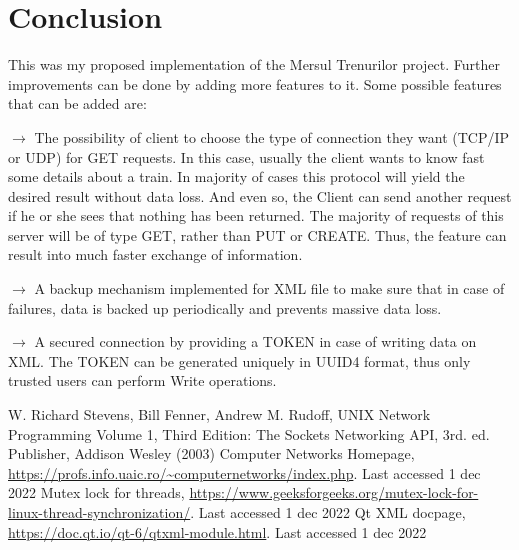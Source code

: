\documentclass[runningheads]{llncs}
\begin{document}
\section{Conclusion}

This was my proposed implementation of the Mersul Trenurilor project. Further improvements can be done by adding more features to it. Some possible features that can be added are:

$\rightarrow$ The possibility of client to choose the type of connection they want (TCP/IP or UDP) for GET requests. In this case, usually the client wants to know fast some details about a train. In majority of cases this protocol will yield the desired result without data loss. And even so, the Client can send another request if he or she sees that nothing has been returned. The majority of requests of this server will be of type GET, rather than PUT or CREATE. Thus, the feature can result into much faster exchange of information.

$\rightarrow$ A backup mechanism implemented for XML file to make sure that in case of failures, data is backed up periodically and prevents massive data loss.

$\rightarrow$ A secured connection by providing a TOKEN in case of writing data on XML. The TOKEN can be generated uniquely in UUID4 format, thus only trusted users can perform Write operations.


\begin{thebibliography}{8}

W. Richard Stevens, Bill Fenner, Andrew M. Rudoff,
UNIX Network Programming Volume 1, Third Edition: The Sockets Networking API, 3rd. ed. Publisher,
Addison Wesley (2003)
Computer Networks Homepage, \url{https://profs.info.uaic.ro/~computernetworks/index.php}. Last accessed 1 dec 2022
Mutex lock for threads, \url{https://www.geeksforgeeks.org/mutex-lock-for-linux-thread-synchronization/}. Last accessed 1 dec 2022
Qt XML docpage, \url{https://doc.qt.io/qt-6/qtxml-module.html}. Last accessed 1 dec 2022
\end{thebibliography}
\end{document}
